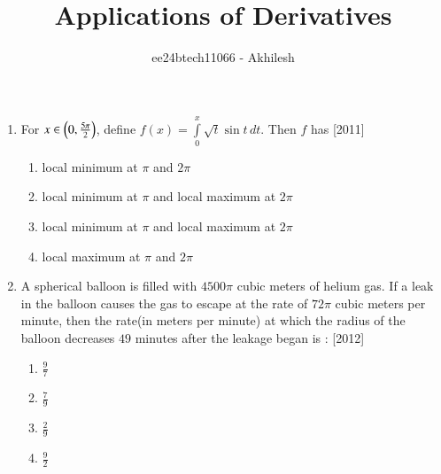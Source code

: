 \documentclass[journal,12pt,twocolumn]{IEEEtran}
\theoremstyle{remark}
\begin{document}

\vspace{3cm}

\title{Applications of Derivatives}
\author{ee24btech11066 - Akhilesh}
\maketitle
\newpage
\bigskip

\renewcommand{\thefigure}{\theenumi}
\renewcommand{\thetable}{\theenumi}
\begin{enumerate}
\item For $x \in \left(0, \frac{5\pi}{2}\right)$, define $f(x)=\int\limits_0^x\sqrt{t}\sin t \, dt$. Then $f$ has \hfill{[2011]}\\
\begin{enumerate}
    \item   local minimum at $\pi$ and $2\pi$\\
    \item   local minimum at $\pi$ and local maximum at $2\pi$
    \item   local minimum at $\pi$ and local maximum at $2\pi$
    \item   local maximum at $\pi$ and $2\pi$\\
\end{enumerate}
    
\item A spherical balloon is filled with $4500\pi$ cubic meters of helium gas. If a leak in the balloon causes the gas to escape at the rate of $72\pi$ cubic meters per minute, then the rate{(in meters per minute)} at which the radius of the balloon decreases $49$ minutes after the leakage began is : \hfill{[2012]}\\
\begin{enumerate}
    \item   $\frac{9}{7}$\\
    \item   $\frac{7}{9}$\\
    \item   $\frac{2}{9}$\\
    \item   $\frac{9}{2}$\\
\end{enumerate} 


\end{enumerate}
\end{document}
